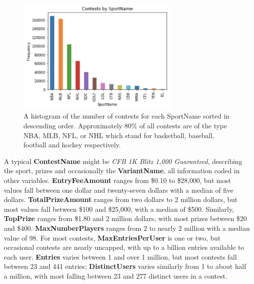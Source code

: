\begin{figure}
\centering
\includegraphics[width=8cm]{body/background/SportName.png}
\caption[SportName Histogram]{A histogram of the number of contests for each SportName sorted in descending order. Approximately 80\% of all contests are of the type NBA, MLB, NFL, or NHL which stand for basketball, baseball, football and hockey respectively.}
\label{fig:sportname}
\end{figure}

A typical \textbf{ContestName} might be \textit{CFB 1K Blitz 1,000 Guaranteed}, describing the sport, prizes and occasionally the \textbf{VariantName}, all information coded in other variables. \textbf{EntryFeeAmount} ranges from \$0.10 to \$28,000, but most values fall between one dollar and twenty-seven dollars with a median of five dollars. \textbf{TotalPrizeAmount} ranges from two dollars to 2 million dollars, but most values fall between \$100 and \$25,000, with a median of \$500. Similarly, \textbf{TopPrize} ranges from \$1.80 and 2 million dollars, with most prizes between \$20 and \$400. \textbf{MaxNumberPlayers} ranges from 2 to nearly 2 million with a median value of 98. For most contests, \textbf{MaxEntriesPerUser} is one or two, but occasional contests are nearly uncapped, with up to a billion entries available to each user. \textbf{Entries} varies between 1 and over 1 million, but most contests fall between 23 and 441 entries; \textbf{DistinctUsers} varies similarly from 1 to about half a million, with most falling between 23 and 277 distinct users in a contest.

